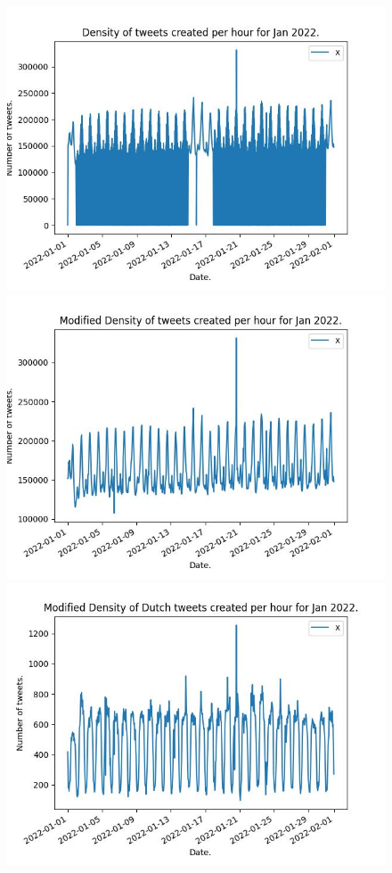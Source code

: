 \documentclass[9pt]{article}
\begin{document}
\begin{figure}[h!]
    \center
    \includegraphics[scale=0.3]{figures/JanAllraw.jpeg}
    \includegraphics[scale=0.3]{figures/JanAllmod.jpeg}
    \includegraphics[scale=0.3]{figures/JanNLmod.jpeg}
\end{figure}
\end{document}

